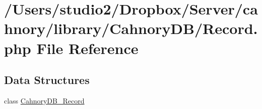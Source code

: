 \hypertarget{_record_8php}{
\section{/Users/studio2/Dropbox/Server/cahnory/library/CahnoryDB/Record.php File Reference}
\label{_record_8php}
}
\subsection*{Data Structures}
\begin{CompactItemize}
\item 
class \hyperlink{class_cahnory_d_b___record}{CahnoryDB\_\-Record}
\end{CompactItemize}
